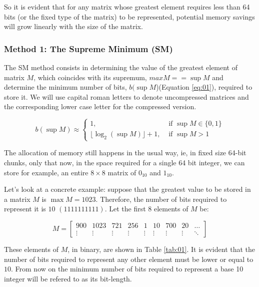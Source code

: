 \documentclass[10pt]{article}
\begin{document}
So it is evident that for any matrix whose greatest element requires less than 
64 bits (or the fixed type of the matrix) to be represented, potential memory 
savings will grow linearly with the size of the matrix.

\subsubsection*{Method 1: The Supreme Minimum (SM)}

The SM method consists in determining the value of the greatest element of 
matrix $M$, which coincides with its supremum, $max M == \sup M$  and determine 
the minimum number of bits, $b(\sup M$)(Equation \ref{eq:01}), required to store 
it. We will use capital roman letters to denote uncompressed matrices and the 
corresponding lower case letter for the compressed version.

\begin{equation} \label{eq:01}
 b(\sup M) \approx \begin{cases}
	1, &  \text{ if } \sup M \in \{0,1\} \\ 
	\lfloor \log_2(\sup M)  \rfloor + 1,  & \text{ if } \sup M > 1  
	\end{cases}
\end{equation}

The allocation of memory still happens in the usual way, ie, in fixed size 
64-bit chunks, only that now, in the space required for a single 64 bit integer, 
we can store for example, an entire $8\times 8$ matrix of $0_{10}$ and 
$1_{10}$. 

Let's look at a concrete example: suppose that the greatest value to be stored 
in a matrix $M$ is $\max M=1023$. Therefore, the number of bits required to 
represent it is $10$ $(1111111111)$. Let the first 8 elements of $M$ be:

\begin{equation} \label{eq:02}
  M = \begin{bmatrix}
  900 & 1023 & 721 & 256 & 1 & 10 & 700 & 20 & \hdots\\ 
  \vdots & \vdots & \vdots & \vdots & \vdots & \vdots & \vdots & \vdots & \ddots 
  \end{bmatrix}
\end{equation}

These elements of $M$, in binary, are shown in Table \ref{tab:01}. It is 
evident that the number of bits required to represent any other element must be 
lower or equal to $10$. From now on the minimum number of bits required to 
represent a base 10 integer will be refered to as its bit-length.
\end{document}

